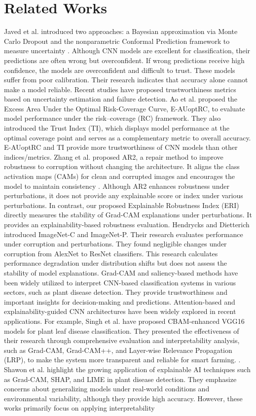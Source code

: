 \documentclass[a4paper,fleqn]{cas-dc}
\begin{document}
\section{Related Works}

Javed et al. introduced two approaches: a Bayesian approximation
via Monte Carlo Dropout and the nonparametric Conformal Prediction framework to measure uncertainty \cite{r14}. Although CNN models are excellent for classification, their predictions are often wrong but overconfident. If wrong predictions receive high confidence, the models are overconfident and difficult to trust. These models suffer from poor calibration. Their research indicates that accuracy alone cannot make a model reliable. Recent studies have proposed trustworthiness metrics based on uncertainty estimation and failure detection. Ao et al. \cite{r15} proposed the Excess Area Under the Optimal Risk-Coverage Curve, E-AUoptRC, to evaluate model performance under the risk–coverage (RC) framework. They also introduced the Trust Index (TI), which displays model performance at the optimal coverage point and serves as a complementary metric to overall accuracy. E-AUoptRC and TI provide more trustworthiness of CNN models than other indices/metrics. Zhang et al. proposed AR2, a repair method to improve robustness to corruption without changing the architecture. It aligns the class activation maps (CAMs) for clean and corrupted images and encourages the model to maintain consistency  \cite{r16}. Although AR2 enhances robustness under perturbations, it does not provide any explainable score or index under various perturbations. In contrast, our proposed Explainable Robustness Index (ERI) directly measures the stability of Grad-CAM explanations under perturbations. It provides an explainability-based robustness evaluation.  Hendrycks and Dietterich \cite{r17} introduced ImageNet-C and ImageNet-P. Their research evaluates performance under corruption and perturbations. They found negligible changes under corruption from AlexNet to ResNet classifiers. This research calculates performance degradation under distribution shifts but does not assess the stability of model explanations. Grad-CAM and saliency-based methods have been widely utilized to interpret CNN-based classification systems in various sectors, such as plant disease detection. They provide trustworthiness and important insights for decision-making and predictions\cite{r18}. Attention-based and explainability-guided CNN architectures have been widely explored in recent applications. For example, Singh et al. have proposed CBAM-enhanced VGG16 models for plant leaf disease classification. They presented the effectiveness of their research through comprehensive evaluation and interpretability analysis, such as Grad-CAM, Grad-CAM++, and Layer-wise Relevance Propagation (LRP), to make the system more transparent and reliable for smart farming. \cite{r19}. Shawon et al. highlight the growing application of explainable AI techniques such as Grad-CAM, SHAP, and LIME in plant disease detection. They emphasize concerns about generalizing models under real-world conditions and environmental variability, although they provide high accuracy\cite{r20}. However, these works primarily focus on applying interpretability 
\end{document}
